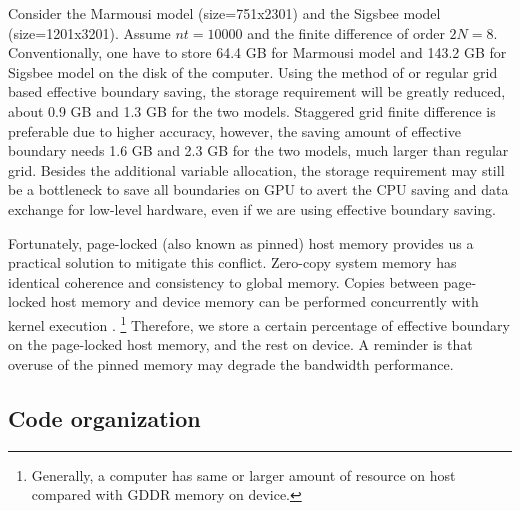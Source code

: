 Consider the Marmousi model (size=751x2301) and the Sigsbee model (size=1201x3201).  Assume $nt=10000$ and the finite difference of order $2N=8$. Conventionally, one have to store 64.4 GB for Marmousi model and 143.2 GB for Sigsbee model on the disk of the computer. Using the method of \cite{dussaud2008computational} or regular grid based effective boundary saving, the storage requirement will be greatly reduced, about 0.9 GB and 1.3 GB for the two models. Staggered grid finite difference is preferable due to higher accuracy, however, the saving amount of effective boundary needs 1.6 GB and 2.3 GB for the two models, much larger than regular grid. Besides the additional variable allocation, the storage requirement may still be a bottleneck to save all boundaries on GPU to avert the CPU saving and data exchange for low-level hardware, even if we are using effective boundary saving.

Fortunately, page-locked (also known as pinned) host memory provides us a practical solution to mitigate this conflict. Zero-copy system memory has identical coherence and consistency to global memory. Copies between page-locked host memory and device memory can be performed concurrently with kernel execution \citep{nvidia2011nvidia}. \footnote{Generally, a computer has same or larger amount of resource on host compared with GDDR memory on device.} Therefore, we store a certain percentage of effective boundary on the page-locked host memory, and the rest on device. A reminder is that overuse of the pinned memory may degrade the bandwidth performance.


\subsection{Code organization}

